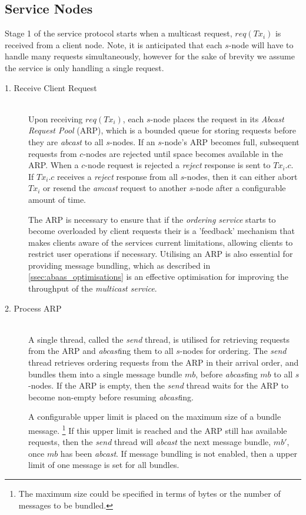     \subsection*{Service Nodes}
    Stage 1 of the service protocol starts when a multicast request, $req(Tx_i)$ is received from a client node.  Note, it is anticipated that each $s$-node will have to handle many requests simultaneously, however for the sake of brevity we assume the service is only handling a single request.  
    
    \begin{description}
        \item[1. Receive Client Request] \hfill \\
            Upon receiving $req(Tx_i)$, each $s$-node places the request in its \emph{Abcast Request Pool} (ARP), which is a bounded queue for storing requests before they are \emph{abcast} to all $s$-nodes.  If an $s$-node's ARP becomes full, subsequent requests from $c$-nodes are rejected until space becomes available in the ARP.  When a $c$-node request is rejected a \emph{reject} response is sent to $Tx_i.c$.  If $Tx_i.c$ receives a \emph{reject} response from all $s$-nodes, then it can either abort $Tx_i$ or resend the \emph{amcast} request to another $s$-node after a configurable amount of time.    
            
            The ARP is necessary to ensure that if the \emph{ordering service} starts to become overloaded by client requests their is a 'feedback' mechanism that makes clients aware of the services current limitations, allowing clients to restrict user operations if necessary.  Utilising an ARP is also essential for providing message bundling, which as described in \ref{ssec:abaas_optimisations} is an effective optimisation for improving the throughput of the \emph{multicast service}.  
            
        \item[2. Process ARP] \hfill \\
        A single thread, called the \emph{send} thread, is utilised for retrieving requests from the ARP and \emph{abcast}ing them to all $s$-nodes for ordering.  The \emph{send} thread retrieves ordering requests from the ARP in their arrival order, and bundles them into a single message bundle $mb$, before \emph{abcast}ing $mb$ to all $s$-nodes.  If the ARP is empty, then the \emph{send} thread waits for the ARP to become non-empty before resuming \emph{abcast}ing.  
		
		A configurable upper limit is placed on the maximum size of a bundle message. \footnote{The maximum size could be specified in terms of bytes or the number of messages to be bundled.} If this upper limit is reached and the ARP still has available requests, then the \emph{send} thread will \emph{abcast} the next message bundle, $mb'$, once $mb$ has been \emph{abcast}.  If message bundling is not enabled, then a upper limit of one message is set for all bundles.    
		

\end{description}
